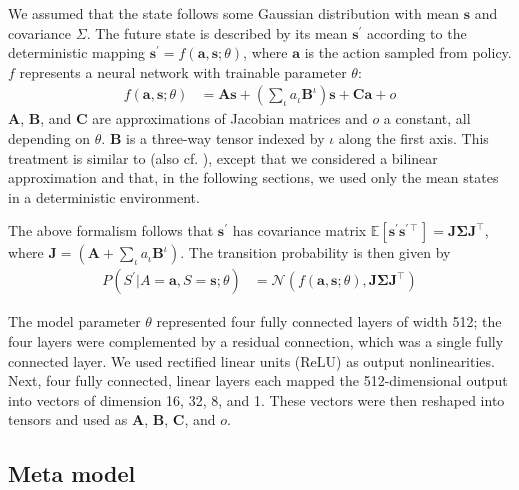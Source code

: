 \documentclass[utf8]{frontiersSCNS}
\newcommand{\bs}{\boldsymbol}
\begin{document}
We assumed that the state follows some Gaussian distribution with mean $\bs{s}$ and covariance $\Sigma$. The future state is described by its mean $\bs{s}^\prime$ according to the deterministic mapping $\bs{s}^\prime = f(\bs{a}, \bs{s}; \theta)$, where $\bs{a}$ is the action sampled from policy. $f$ represents a neural network with trainable parameter $\theta$:
%
	\begin{equation}
	\begin{aligned} \label{eq:imp-fm}
	f(\bs{a}, \bs{s}; \theta) &= \bs{A} \bs{s} + 
	\left( \sum_\iota a_{\iota} \bs{B}^{\iota} \right) \bs{s} + 
	\bs{C} \bs{a} + o
	\end{aligned}
	\end{equation}
%
$\bs{A}$, $\bs{B}$, and $\bs{C}$ are approximations of Jacobian matrices and $o$ a constant, all depending on $\theta$. $\bs{B}$ is a three-way tensor indexed by $\iota$ along the first axis. This treatment is similar to \citet{e2c} (also cf. \citet{dvbf}), except that we considered a bilinear approximation and that, in the following sections, we used only the mean states in a deterministic environment.

The above formalism follows that $\bs{s}^\prime$ has covariance matrix $\mathbb{E}[\bs{s}^\prime\bs{s}^{\prime\intercal}] = \bs{J} \bs{\Sigma} \bs{J}^\intercal$, where $\bs{J} = \left( \bs{A} + \sum_\iota a_\iota \bs{B}^\iota \right)$. The transition probability is then given by 
%
	\begin{equation}
	\begin{aligned} \label{eq:imp-fmcov}
	P(S^\prime | A=\bs{a}, S=\bs{s}; \theta) &= \mathcal N \left(f(\bs{a}, \bs{s}; \theta), \bs{J} \bs{\Sigma} \bs{J}^\intercal \right)
	\end{aligned}
	\end{equation}

The model parameter $\theta$ represented four fully connected layers of width 512; the four layers were complemented by a residual connection, which was a single fully connected layer.  We used rectified linear units (ReLU) as output nonlinearities. Next, four fully connected, linear layers each mapped the 512-dimensional output into vectors of dimension 16, 32, 8, and 1. These vectors were then reshaped into tensors and used as $\bs A$, $\bs B$, $\bs C$, and $o$.

\subsection{Meta model}
\end{document}
